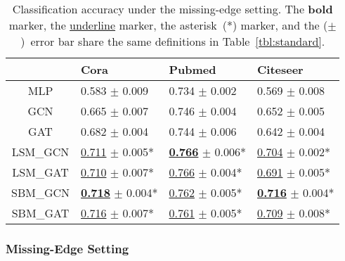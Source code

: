 \documentclass{article}
\begin{document}
\begin{table}[tb]
\centering
\caption{Classification accuracy under the missing-edge setting. The \textbf{bold} marker, the \underline{underline} marker, the asterisk~(*) marker, and the ($\pm$)~error bar share the same definitions in Table~\ref{tbl:standard}.}
\label{tbl:missing}
\begin{tabular}{clll}
\toprule
{} &                                            Cora &                                          Pubmed &                                        Citeseer \\
\midrule
MLP     &                       0.583 $\pm$ \small{0.009} &                       0.734 $\pm$ \small{0.002} &                       0.569 $\pm$ \small{0.008} \\
GCN     &                       0.665 $\pm$ \small{0.007} &                       0.746 $\pm$ \small{0.004} &                       0.652 $\pm$ \small{0.005} \\
GAT     &                       0.682 $\pm$ \small{0.004} &                       0.744 $\pm$ \small{0.006} &                       0.642 $\pm$ \small{0.004} \\
\hline
LSM\_GCN &           \underline{0.711} $\pm$ \small{0.005}* &  \underline{\textbf{0.766}} $\pm$ \small{0.006}* &           \underline{0.704} $\pm$ \small{0.002}* \\
LSM\_GAT &           \underline{0.710} $\pm$ \small{0.007}* &           \underline{0.766} $\pm$ \small{0.004}* &           \underline{0.691} $\pm$ \small{0.005}* \\
SBM\_GCN &  \underline{\textbf{0.718}} $\pm$ \small{0.004}* &           \underline{0.762} $\pm$ \small{0.005}* &  \underline{\textbf{0.716}} $\pm$ \small{0.004}* \\
SBM\_GAT &           \underline{0.716} $\pm$ \small{0.007}* &           \underline{0.761} $\pm$ \small{0.005}* &           \underline{0.709} $\pm$ \small{0.008}* \\
\bottomrule
\end{tabular}

\end{table}

\subsubsection{Missing-Edge Setting}
\label{sec:me}
\end{document}
